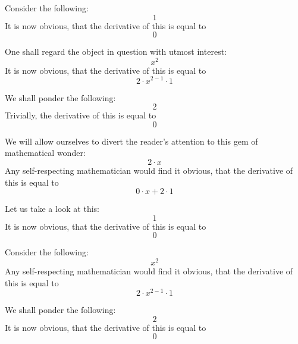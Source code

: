 \documentclass{article}
\begin{document}
Consider the following:
\begin{equation}
1 
\end{equation}
It is now obvious, that the derivative of this is equal to
\begin{equation}
0 
\end{equation}

One shall regard the object in question with utmost interest:
\begin{equation}
x ^{2 } 
\end{equation}
It is now obvious, that the derivative of this is equal to
\begin{equation}
2 \cdot x ^{2 - 1 } \cdot 1 
\end{equation}

We shall ponder the following:
\begin{equation}
2 
\end{equation}
Trivially, the derivative of this is equal to
\begin{equation}
0 
\end{equation}

We will allow ourselves to divert the reader's attention to this gem of mathematical wonder:
\begin{equation}
2 \cdot x 
\end{equation}
Any self-respecting mathematician would find it obvious, that the derivative of this is equal to
\begin{equation}
0 \cdot x + 2 \cdot 1 
\end{equation}

Let us take a look at this:
\begin{equation}
1 
\end{equation}
It is now obvious, that the derivative of this is equal to
\begin{equation}
0 
\end{equation}

Consider the following:
\begin{equation}
x ^{2 } 
\end{equation}
Any self-respecting mathematician would find it obvious, that the derivative of this is equal to
\begin{equation}
2 \cdot x ^{2 - 1 } \cdot 1 
\end{equation}

We shall ponder the following:
\begin{equation}
2 
\end{equation}
It is now obvious, that the derivative of this is equal to
\begin{equation}
0 
\end{equation}
\end{document}
